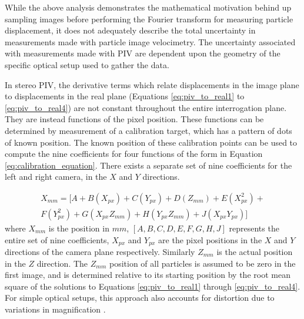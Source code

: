 

While the above analysis demonstrates the mathematical motivation behind up 
sampling images before performing the Fourier transform for measuring particle 
displacement, it does not adequately describe the total uncertainty in 
measurements made with particle image velocimetry. The uncertainty associated 
with measurements made with PIV are dependent upon the geometry of the specific 
optical setup used to gather the data.

In stereo PIV,  the 
derivative terms which relate displacements in the image plane to displacements 
in the real plane (Equations \ref{eq:piv_to_real1} to \ref{eq:piv_to_real4}) 
are not constant throughout the entire interrogation plane. They are instead 
functions of the pixel position. These functions can be determined by 
measurement of a calibration target, which has a pattern of dots of known 
position. The known position of these calibration points can 
be used to compute the nine coefficients for four functions of the form in 
Equation \ref{eq:calibration_equation}. There exists a separate set of nine 
coefficients for the left and right camera, in the $X$ and $Y$ directions.

\begin{equation}
	\begin{multlined}
	X_{mm} =  [A + B(X_{px}) + C(Y_{px}) + D(Z_{mm}) + E(X_{px}^2) + \\
	F(Y_{px}^2) + G(X_{px}Z_{mm}) + H(Y_{px}Z_{mm}) + J(X_{px}Y_{px})]
	\end{multlined}
	\label{eq:calibration_equation}
\end{equation}
\newline
\noindent
where $X_{mm}$ is the position in $mm$, $[A, B, C, D, E, F, G, H, J]$ 
represents the entire set of nine coefficients, $X_{px}$ and $Y_{px}$ are the 
pixel positions in the $X$ and $Y$ directions of the camera plane 
respectively. Similarly $Z_{mm}$ is the actual position in the $Z$ direction. 
The 
$Z_{mm}$ position of all particles is assumed to be zero in the first image, 
and is determined relative to its starting position by the root mean square of 
the solutions to Equations \ref{eq:piv_to_real1} through \ref{eq:piv_to_real4}.
For simple optical setups, this approach also accounts for distortion due to 
variations in magnification \cite{soloff1997, willert1997}.


